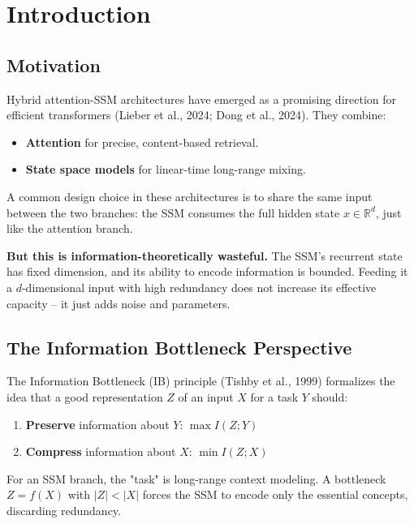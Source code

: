 \section{Introduction}

\subsection{Motivation}

Hybrid attention-SSM architectures have emerged as a promising direction for 
efficient transformers (Lieber et al., 2024; Dong et al., 2024). They 
combine:

\begin{itemize}
\item \textbf{Attention} for precise, content-based retrieval.
\item \textbf{State space models} for linear-time long-range mixing.

\end{itemize}
A common design choice in these architectures is to share the same input 
between the two branches: the SSM consumes the full hidden state 
$x \in \mathbb{R}^d$, just like the attention branch.

\textbf{But this is information-theoretically wasteful.} The SSM's recurrent 
state has fixed dimension, and its ability to encode information is bounded. 
Feeding it a $d$-dimensional input with high redundancy does not increase 
its effective capacity -- it just adds noise and parameters.

\subsection{The Information Bottleneck Perspective}

The Information Bottleneck (IB) principle (Tishby et al., 1999) formalizes 
the idea that a good representation $Z$ of an input $X$ for a task $Y$ 
should:

\begin{enumerate}
\item \textbf{Preserve} information about $Y$: $\max I(Z; Y)$
\item \textbf{Compress} information about $X$: $\min I(Z; X)$

\end{enumerate}
For an SSM branch, the "task" is long-range context modeling. A bottleneck 
$Z = f(X)$ with $|Z| < |X|$ forces the SSM to encode only the essential 
concepts, discarding redundancy.

